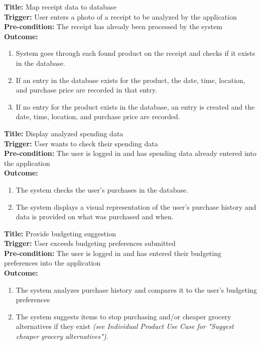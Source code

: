 \documentclass[12pt]{article}
\begin{document}
\medskip
\noindent \textbf{Title:} Map receipt data to database\\
\textbf{Trigger:} User enters a photo of a receipt to be analyzed by the application\\
\textbf{Pre-condition:} The receipt has already been processed by the system\\
\textbf{Outcome:}
\begin{enumerate}
  \item System goes through each found product on the receipt and
  checks if it exists in the database.
  \item If an entry in the database exists for the product, the date, time, location,
  and purchase price are recorded in that entry.
  \item If no entry for the product exists in the database, an entry is created and the
  date, time, location, and purchase price are recorded.
\end{enumerate}

\medskip
\noindent \textbf{Title:} Display analyzed spending data\\
\textbf{Trigger:} User wants to check their spending data\\
\textbf{Pre-condition:} The user is logged in and has spending data already entered into the application\\
\textbf{Outcome:}
\begin{enumerate}
  \item The system checks the user's purchases in the database.
  \item The system displays a visual representation of the user's purchase history and
  data is provided on what was purchased and when.
\end{enumerate}

\medskip
\noindent \textbf{Title:} Provide budgeting suggestion\\
\textbf{Trigger:} User exceeds budgeting preferences submitted\\
\textbf{Pre-condition:} The user is logged in and has entered their budgeting preferences into the application\\
\textbf{Outcome:}
\begin{enumerate}
  \item The system analyzes purchase history and compares it to the user's
  budgeting preferences
  \item The system suggests items to stop purchasing and/or cheaper grocery alternatives
  if they exist \textit{(see Individual Product Use Case for "Suggest cheaper grocery
  alternatives")}.
\end{enumerate}
\end{document}
